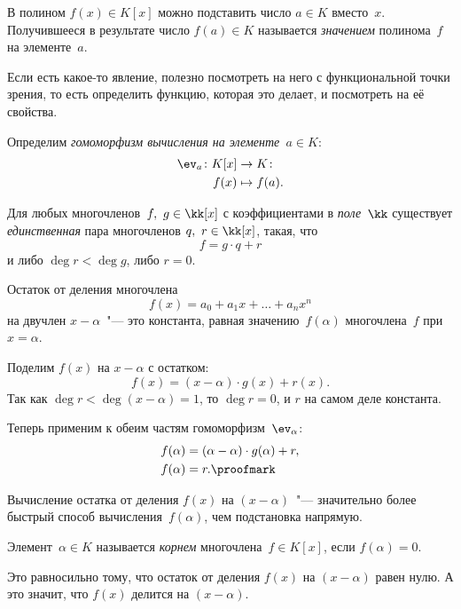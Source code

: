 В полином $f(x) \in K[x]$ можно подставить число $a \in K$ вместо~$x$. Получившееся в результате число $f(a) \in K$ называется \emph{значением} полинома~$f$ на элементе~$a$.

Если есть какое-то явление, полезно посмотреть на него с функциональной точки зрения, то есть определить функцию, которая это делает, и посмотреть на её свойства.

Определим \emph{гомоморфизм вычисления на элементе~$a \in K$}:
\begin{align*}
	\ev_a \colon K[x] &\to K
	\colon
	\\
	f(x) &\mapsto f(a)
	.
\end{align*}

\begin{lemma}
	Для любых многочленов~$f,\ g \in \kk[x]$ с коэффициентами в \emph{поле}~$\kk$ существует \emph{единственная} пара многочленов $q,\ r \in \kk[x]$, такая, что
	\[
		f = g \cdot q + r
	\]
	и либо $\deg{r} < \deg{g}$, либо $r = 0$.
\end{lemma}

\begin{lemma}
	Остаток от деления многочлена
	\[
		f(x) = a_0 + a_1 x + \dots + a_n x^n
	\]
	на двучлен $x - \alpha$~"--- это константа, равная значению~$f(\alpha)$ многочлена~$f$ при $x = \alpha$.
\end{lemma}
\begin{proofm}
	Поделим $f(x)$ на $x - \alpha$ с остатком:
	\[
		f(x) = (x - \alpha) \cdot g(x) + r(x)
		.
	\]
	Так как $\deg{r} < \deg(x - \alpha) = 1$, то $\deg{r} = 0$, и $r$ на самом деле константа.

	Теперь применим к обеим частям гомоморфизм~$\ev_{\alpha}$:
	\begin{align*}
		f(\alpha) &= (\alpha - \alpha) \cdot g(\alpha) + r,
		\\
		f(\alpha) &= r.
		\proofmark
	\end{align*}
\end{proofm}
\begin{remark}
	Вычисление остатка от деления $f(x)$ на $(x - \alpha)$~"--- значительно более быстрый способ вычисления~$f(\alpha)$, чем подстановка напрямую.
\end{remark}

\begin{definition}
	Элемент~$\alpha \in K$ называется \emph{корнем} многочлена~$f \in K[x]$, если $f(\alpha) = 0$.
\end{definition}
\begin{remark}
	Это равносильно тому, что остаток от деления $f(x)$ на $(x - \alpha)$ равен нулю. А это значит, что $f(x)$ делится на $(x - \alpha)$.
\end{remark}

